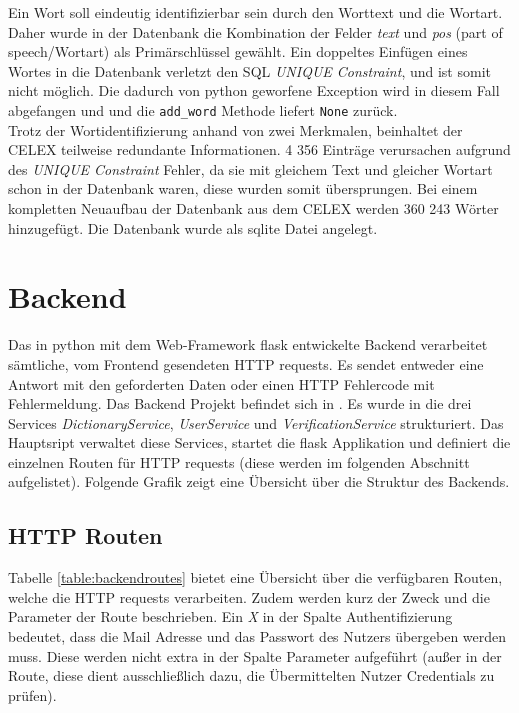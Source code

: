 Ein Wort soll eindeutig identifizierbar sein durch den Worttext und die Wortart. Daher wurde in der Datenbank die Kombination der Felder \textit{text} und \textit{pos} (part of speech/Wortart) als Primärschlüssel gewählt. Ein doppeltes Einfügen eines Wortes in die Datenbank verletzt den SQL \textit{UNIQUE Constraint}, und ist somit nicht möglich. Die dadurch von python geworfene Exception wird in diesem Fall abgefangen und und die \texttt{add\_word} Methode liefert \texttt{None} zurück.\\
Trotz der Wortidentifizierung anhand von zwei Merkmalen, beinhaltet der CELEX teilweise redundante Informationen. 4 356 Einträge verursachen aufgrund des \textit{UNIQUE Constraint} Fehler, da sie mit gleichem Text und gleicher Wortart schon in der Datenbank waren, diese wurden somit übersprungen. Bei einem kompletten Neuaufbau der Datenbank aus dem CELEX werden 360 243 Wörter hinzugefügt. Die Datenbank wurde als sqlite Datei  angelegt.

\section{Backend}
\label{sec:etwicklung-backend}
Das in python mit dem Web-Framework flask entwickelte Backend verarbeitet sämtliche, vom Frontend gesendeten HTTP requests. Es sendet entweder eine Antwort mit den geforderten Daten oder einen HTTP Fehlercode mit Fehlermeldung. Das Backend Projekt befindet sich in . Es wurde in die drei Services \textit{DictionaryService}, \textit{UserService} und \textit{VerificationService} strukturiert. Das Hauptsript   verwaltet diese Services, startet die flask Applikation und definiert die einzelnen Routen für HTTP requests (diese werden im folgenden Abschnitt aufgelistet). Folgende Grafik zeigt eine Übersicht über die Struktur des Backends.


\subsection{HTTP Routen}
Tabelle \ref{table:backendroutes} bietet eine Übersicht über die verfügbaren Routen, welche die HTTP requests verarbeiten. Zudem werden kurz der Zweck und die Parameter der Route beschrieben. Ein \textit{X} in der Spalte Authentifizierung bedeutet, dass die Mail Adresse und das Passwort des Nutzers übergeben werden muss. Diese werden nicht extra in der Spalte Parameter aufgeführt (außer in der  Route, diese dient ausschließlich dazu, die Übermittelten Nutzer Credentials zu prüfen).

